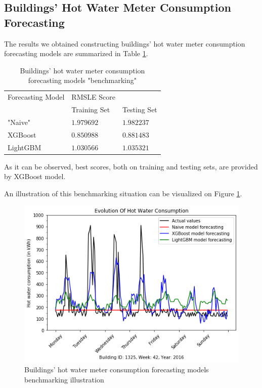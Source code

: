 \documentclass[twocolumn, switch]{article}
\begin{document}
\subsection{Buildings' Hot Water Meter Consumption Forecasting}

The results we obtained constructing buildings' hot water meter consumption forecasting models are summarized in Table \ref{tab:hot_water_benchmarking}.

\begin{table}[H]
\caption{Buildings' hot water meter consumption forecasting models "benchmarking"}
\centering
\begin{tabular}{lll}
\toprule
Forecasting Model & RMSLE Score & \\
& Training Set & Testing Set \\
\midrule
"Naive" & $1.979692$ & $1.982237$ \\
XGBoost & $0.850988$ & $0.881483$ \\
LightGBM & $1.030566$ & $1.035321$ \\
\bottomrule
\end{tabular}
\label{tab:hot_water_benchmarking}
\end{table}

As it can be observed, best scores, both on training and testing sets, are provided by XGBoost model.

An illustration of this benchmarking situation can be visualized on Figure \ref{fig:hot_water_benchmarking_illustration}.

\begin{figure}[H]
\centering
\includegraphics[scale=0.35]{../graphs/sample_hot_water_consumption_comparison}
\caption{Buildings' hot water meter consumption forecasting models benchmarking illustration}
\label{fig:hot_water_benchmarking_illustration}
\end{figure}
\end{document}
